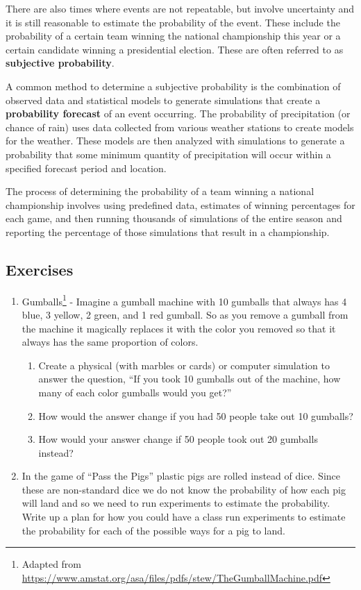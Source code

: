 \documentclass[
]{book}
\providecommand{\tightlist}{%
  \setlength{\itemsep}{0pt}\setlength{\parskip}{0pt}}
\theoremstyle{definition}
\theoremstyle{definition}
\theoremstyle{definition}
\theoremstyle{definition}
\theoremstyle{remark}
\begin{document}
There are also times where events are not repeatable, but involve uncertainty and it is still reasonable to estimate the probability of the event. These include the probability of a certain team winning the national championship this year or a certain candidate winning a presidential election. These are often referred to as \textbf{subjective probability}.

A common method to determine a subjective probability is the combination of observed data and statistical models to generate simulations that create a \textbf{probability forecast} of an event occurring. The probability of precipitation (or chance of rain) uses data collected from various weather stations to create models for the weather. These models are then analyzed with simulations to generate a probability that some minimum quantity of precipitation will occur within a specified forecast period and location.

The process of determining the probability of a team winning a national championship involves using predefined data, estimates of winning percentages for each game, and then running thousands of simulations of the entire season and reporting the percentage of those simulations that result in a championship.

\hypertarget{exercises-66}{%
\subsection{Exercises}\label{exercises-66}}

\begin{enumerate}
\def\labelenumi{\arabic{enumi}.}
\item
  Gumballs\footnote{Adapted from \url{https://www.amstat.org/asa/files/pdfs/stew/TheGumballMachine.pdf}} - Imagine a gumball machine with 10 gumballs that always has 4 blue, 3 yellow, 2 green, and 1 red gumball. So as you remove a gumball from the machine it magically replaces it with the color you removed so that it always has the same proportion of colors.

  \begin{enumerate}
  \def\labelenumii{\alph{enumii}.}
  \tightlist
  \item
    Create a physical (with marbles or cards) or computer simulation to answer the question, ``If you took 10 gumballs out of the machine, how many of each color gumballs would you get?''
  \item
    How would the answer change if you had 50 people take out 10 gumballs?
  \item
    How would your answer change if 50 people took out 20 gumballs instead?
  \end{enumerate}
\item
  In the game of ``Pass the Pigs'' plastic pigs are rolled instead of dice. Since these are non-standard dice we do not know the probability of how each pig will land and so we need to run experiments to estimate the probability. Write up a plan for how you could have a class run experiments to estimate the probability for each of the possible ways for a pig to land.
\end{enumerate}
\end{document}
